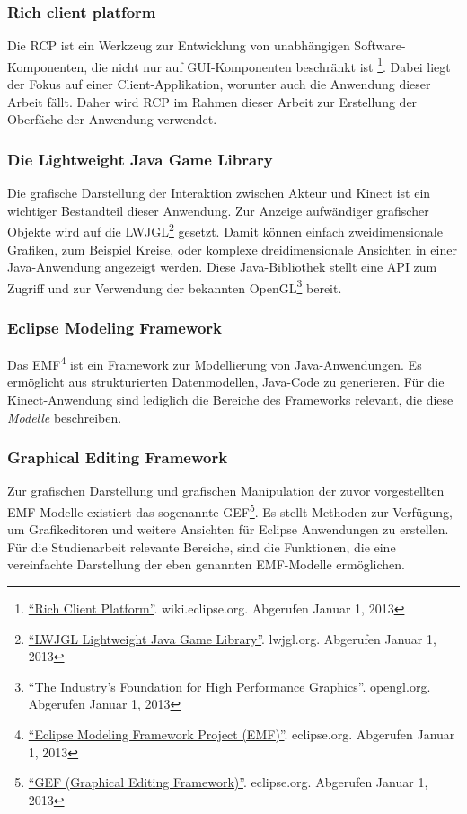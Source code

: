 \subsubsection{Rich client platform}
Die \gls{RCP} ist ein Werkzeug zur Entwicklung von unabh\"angigen Software-Komponenten, die nicht nur auf \acrshort{GUI}-Komponenten beschr\"ankt ist
\footnote{\href{http://wiki.eclipse.org/index.php/Rich_Client_Platform}{\enquote{Rich Client Platform}}. wiki.eclipse.org. Abgerufen Januar 1, 2013}.
Dabei liegt der Fokus auf einer Client-Applikation, worunter auch die Anwendung dieser Arbeit f\"allt.
Daher wird \acrshort{RCP} im Rahmen dieser Arbeit zur Erstellung der Oberf\"ache der Anwendung verwendet.
\subsubsection{Die Lightweight Java Game Library}
Die grafische Darstellung der Interaktion zwischen Akteur und Kinect ist ein wichtiger Bestandteil dieser Anwendung.
Zur Anzeige aufw\"andiger grafischer Objekte wird auf die \gls{LWJGL}\footnote{\href{http://www.lwjgl.org/}{\enquote{LWJGL Lightweight Java Game Library}}. lwjgl.org. Abgerufen Januar 1, 2013} gesetzt.
Damit k\"onnen einfach zweidimensionale Grafiken, zum Beispiel Kreise, oder komplexe dreidimensionale Ansichten in einer Java-Anwendung angezeigt werden.
Diese Java-Bibliothek stellt eine API zum Zugriff und zur Verwendung der bekannten \gls{OpenGL}\footnote{\href{https://www.opengl.org/}{\enquote{The Industry's Foundation for High Performance Graphics}}. opengl.org. Abgerufen Januar 1, 2013} bereit.

\subsubsection{Eclipse Modeling Framework}
Das \gls{EMF}\footnote{\href{http://www.eclipse.org/modeling/emf/}{\enquote{Eclipse Modeling Framework Project (EMF)}}. eclipse.org. Abgerufen Januar 1, 2013} ist ein Framework zur Modellierung von Java-Anwendungen.
Es erm\"oglicht aus strukturierten Datenmodellen, Java-Code zu generieren. F\"ur die Kinect-Anwendung sind lediglich die Bereiche des Frameworks relevant, die diese \textit{Modelle} beschreiben.
 
\subsubsection{Graphical Editing Framework}
Zur grafischen Darstellung und grafischen Manipulation der zuvor vorgestellten EMF-Modelle existiert das sogenannte \gls{GEF}\footnote{\href{http://www.eclipse.org/gef/}{\enquote{GEF (Graphical Editing Framework)}}. eclipse.org. Abgerufen Januar 1, 2013}.
Es stellt Methoden zur Verf\"ugung, um Grafikeditoren und weitere Ansichten f\"ur Eclipse Anwendungen zu erstellen. F\"ur die Studienarbeit relevante Bereiche, sind die Funktionen, die eine vereinfachte Darstellung der eben genannten EMF-Modelle erm\"oglichen.

